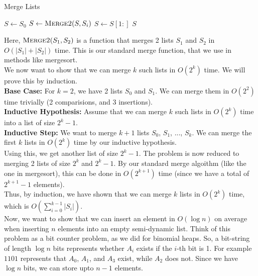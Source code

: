 \documentclass[a4paper]{article}
\begin{document}
\begin{algorithm}
\caption{Merge Lists}
\begin{algorithmic}[1]
    \State $S \gets S_0$
        \State $S \gets \textsc{Merge2}(S, S_i)$
    \EndFor
    \State $S \gets S[1:]$ 
    \State \Return $S$
\EndFunction
\end{algorithmic}
\end{algorithm}


\noindent Here, $\textsc{Merge2}(S_1, S_2)$ is a function that merges 2 lists $S_1$ and $S_2$ in $O(|S_1| + |S_2|)$ time. This is our standard merge function, that we use in methods like mergesort. \\

\noindent We now want to show that we can merge $k$ such lists in $O(2^k)$ time. We will prove this by induction.\\

\noindent \textbf{Base Case:} For $k = 2$, we have 2 lists $S_0$ and $S_1$. We can merge them in $O(2^2)$ time trivially (2 comparisions, and 3 insertions).\\

\noindent \textbf{Inductive Hypothesis:} Assume that we can merge $k$ such lists in $O(2^k)$ time into a list of size $2^k - 1$.\\

\noindent \textbf{Inductive Step:} We want to merge $k+1$ lists $S_0$, $S_1$, ..., $S_k$. We can merge the first $k$ lists in $O(2^k)$ time by our inductive hypothesis.\\

\noindent Using this, we get another list of size $2^k - 1$. The problem is now reduced to merging 2 lists of size $2^k$ and $2^k - 1$. By our standard merge algoithm (like the one in mergesort), this can be done in $O(2^{k+1})$ time (since we have a total of $2^{k+1} - 1$ elements).\\

\noindent Thus, by induction, we have shown that we can merge $k$ lists in $O(2^k)$ time, which is $O(\sum_{i=0}^{k-1}|S_i|)$.\\

\noindent Now, we want to show that we can insert an element in $O(\log n)$ on average when inserting $n$ elements into an empty semi-dynamic list. Think of this problem as a bit counter problem, as we did for binomial heaps. So, a bit-string of length $\log n$ bits represents whether $A_i$ exists if the $i$-th bit is 1. For example $1101$ represents that $A_0$, $A_1$, and $A_3$ exist, while $A_2$ does not. Since we have $\log n$ bits, we can store upto $n - 1$ elements.\\
\end{document}
